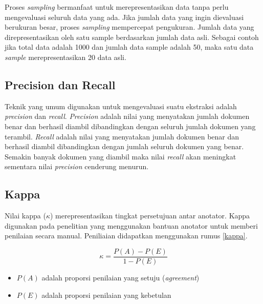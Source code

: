 Proses \textit{sampling} bermanfaat untuk merepresentasikan data tanpa perlu mengevaluasi seluruh data yang ada. Jika jumlah data yang ingin dievaluasi berukuran besar, proses \textit{sampling} mempercepat pengukuran. Jumlah data yang direpresentasikan oleh satu sample berdasarkan jumlah data asli. Sebagai contoh jika total data adalah 1000 dan jumlah data sample adalah 50, maka satu data \textit{sample} merepresentasikan 20 data asli.

\subsection{Precision dan Recall}
Teknik yang umum digunakan untuk mengevaluasi suatu ekstraksi adalah \textit{precision} dan \textit{recall}. \textit{Precision} adalah nilai yang menyatakan jumlah dokumen benar dan berhasil diambil dibandingkan dengan seluruh jumlah dokumen yang terambil. \textit{Recall} adalah nilai yang menyatakan jumlah dokumen benar dan berhasil diambil dibandingkan dengan jumlah seluruh dokumen yang benar. Semakin banyak dokumen yang diambil maka nilai \textit{recall} akan meningkat sementara nilai \textit{precision} cenderung menurun. 

\subsection{Kappa}
Nilai kappa ($\kappa$) merepresentasikan tingkat persetujuan antar anotator. Kappa digunakan pada penelitian yang menggunakan bantuan anotator untuk memberi penilaian secara manual. Peniliaian didapatkan menggunakan rumus \ref{kappa}.

\begin{equation}
\label{kappa}
\kappa=\frac{P(A)-P(E)}{1-P(E)}
\end{equation}

\begin{itemize}
  \item $P(A)$ adalah proporsi penilaian yang setuju (\textit{agreement})
  \item $P(E)$ adalah proporsi penilaian yang kebetulan
\end{itemize}

